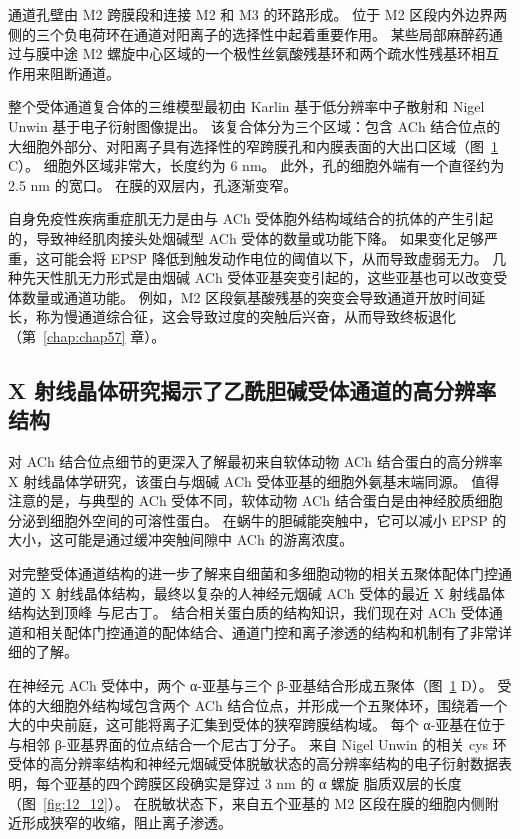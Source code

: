 \begin{figure}[htbp]
	\label{fig:12_11}
\end{figure}


通道孔壁由 M2 跨膜段和连接 M2 和 M3 的环路形成。
位于 M2 区段内外边界两侧的三个负电荷环在通道对阳离子的选择性中起着重要作用。
某些局部麻醉药通过与膜中途 M2 螺旋中心区域的一个极性丝氨酸残基环和两个疏水性残基环相互作用来阻断通道。


整个受体通道复合体的三维模型最初由 Karlin 基于低分辨率中子散射和 Nigel Unwin 基于电子衍射图像提出。
该复合体分为三个区域：包含 ACh 结合位点的大细胞外部分、对阳离子具有选择性的窄跨膜孔和内膜表面的大出口区域（图~\ref{fig:12_11} C）。
细胞外区域非常大，长度约为 6 nm。
此外，孔的细胞外端有一个直径约为 2.5 nm 的宽口。 
在膜的双层内，孔逐渐变窄。


自身免疫性疾病重症肌无力是由与 ACh 受体胞外结构域结合的抗体的产生引起的，导致神经肌肉接头处烟碱型 ACh 受体的数量或功能下降。
如果变化足够严重，这可能会将 EPSP 降低到触发动作电位的阈值以下，从而导致虚弱无力。
几种先天性肌无力形式是由烟碱 ACh 受体亚基突变引起的，这些亚基也可以改变受体数量或通道功能。
例如，M2 区段氨基酸残基的突变会导致通道开放时间延长，称为慢通道综合征，这会导致过度的突触后兴奋，从而导致终板退化（第~\ref{chap:chap57} 章）。



\subsection{X 射线晶体研究揭示了乙酰胆碱受体通道的高分辨率结构}

对 ACh 结合位点细节的更深入了解最初来自软体动物 ACh 结合蛋白的高分辨率 X 射线晶体学研究，该蛋白与烟碱 ACh 受体亚基的细胞外氨基末端同源。
值得注意的是，与典型的 ACh 受体不同，软体动物 ACh 结合蛋白是由神经胶质细胞分泌到细胞外空间的可溶性蛋白。
在蜗牛的胆碱能突触中，它可以减小 EPSP 的大小，这可能是通过缓冲突触间隙中 ACh 的游离浓度。


对完整受体通道结构的进一步了解来自细菌和多细胞动物的相关五聚体配体门控通道的 X 射线晶体结构，最终以复杂的人神经元烟碱 ACh 受体的最近 X 射线晶体结构达到顶峰 与尼古丁。
结合相关蛋白质的结构知识，我们现在对 ACh 受体通道和相关配体门控通道的配体结合、通道门控和离子渗透的结构和机制有了非常详细的了解。


在神经元 ACh 受体中，两个 α-亚基与三个 β-亚基结合形成五聚体（图~\ref{fig:12_11} D）。
受体的大细胞外结构域包含两个 ACh 结合位点，并形成一个五聚体环，围绕着一个大的中央前庭，这可能将离子汇集到受体的狭窄跨膜结构域。
每个 α-亚基在位于与相邻 β-亚基界面的位点结合一个尼古丁分子。
来自 Nigel Unwin 的相关 cys 环受体的高分辨率结构和神经元烟碱受体脱敏状态的高分辨率结构的电子衍射数据表明，每个亚基的四个跨膜区段确实是穿过 3 nm 的 α 螺旋 脂质双层的长度（图~\ref{fig:12_12}）。
在脱敏状态下，来自五个亚基的 M2 区段在膜的细胞内侧附近形成狭窄的收缩，阻止离子渗透。


